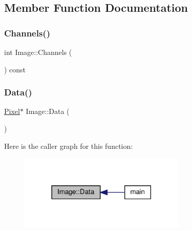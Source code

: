 \subsection{Member Function Documentation}
\mbox{\label{structImage_acd164a8d76fb05eb3f0123b50032b4a4}} 
\subsubsection{\texorpdfstring{Channels()}{Channels()}}
{\footnotesize\ttfamily int Image\+::\+Channels (\begin{DoxyParamCaption}{ }\end{DoxyParamCaption}) const\hspace{0.3cm}{\ttfamily [inline]}}

\mbox{\label{structImage_aad45e088de1f92fde63d3bcd7d542cdd}} 
\subsubsection{\texorpdfstring{Data()}{Data()}}
{\footnotesize\ttfamily \hyperlink{structPixel}{Pixel}$\ast$ Image\+::\+Data (\begin{DoxyParamCaption}{ }\end{DoxyParamCaption})\hspace{0.3cm}{\ttfamily [inline]}}

Here is the caller graph for this function\+:
\nopagebreak
\begin{figure}[H]
\begin{center}
\leavevmode
\includegraphics[width=225pt]{structImage_aad45e088de1f92fde63d3bcd7d542cdd_icgraph}
\end{center}
\end{figure}
\mbox{\label{structImage_a0bedb6561074b2cdf3f5a577c80e043a}} 
